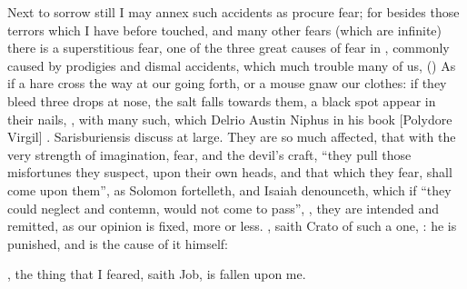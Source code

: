 Next to sorrow still I may annex such accidents as procure fear; for besides
those terrors which I have before touched, and many other
fears (which are infinite) there is a superstitious fear, one of the three
great causes of fear in \Aristotle{}, commonly caused by prodigies and dismal
accidents, which much trouble many of us, () As if a hare cross the way at our going forth, or a mouse
gnaw our clothes: if they bleed three drops at nose, the salt falls towards
them, a black spot appear in their nails, \etc{}, with many such, which Delrio
 Austin Niphus in his book
 [Polydore Virgil]
. Sarisburiensis
 discuss at large. They are so
much affected, that with the very strength of imagination, fear, and the
devil's craft, \enquote{they pull those misfortunes they suspect,
upon their own heads, and that which they fear, shall come upon them}, as
Solomon fortelleth,  and Isaiah denounceth,
 which if \enquote{they could neglect and
contemn, would not come to pass}, , they are intended and remitted, as our
opinion is fixed, more or less. , saith
Crato of such a one, : he is
punished, and is the cause of it himself:

, the thing that I feared, saith
Job, is fallen upon me.

